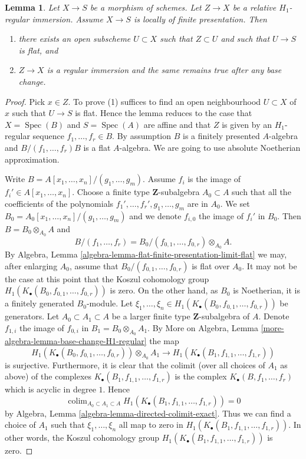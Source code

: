 \documentclass[10pt,a4paper]{amsart}
\theoremstyle{plain}
\newtheorem{lemma}[subsection]{Lemma}
\theoremstyle{definition}
\theoremstyle{remark}
\numberwithin{equation}{subsection}
\def\colim{\mathop{\mathrm{colim}}\nolimits}
\def\Spec{\mathop{\mathrm{Spec}}}
\begin{document}
\begin{lemma}
\label{lemma-flat-relative-H1-regular}
Let $X \to S$ be a morphism of schemes.
Let $Z \to X$ be a relative $H_1$-regular immersion.
Assume $X \to S$ is locally of finite presentation. Then
\begin{enumerate}
\item there exists an open subscheme $U \subset X$ such that
$Z \subset U$ and such that $U \to S$ is flat, and
\item $Z \to X$ is a regular immersion and the same remains
true after any base change.
\end{enumerate}
\end{lemma}

\begin{proof}
Pick $x \in Z$. To prove (1) suffices to find an open neighbourhood
$U \subset X$ of $x$ such that $U \to S$ is flat. Hence the lemma reduces
to the case that $X = \Spec(B)$ and $S = \Spec(A)$ are affine
and that $Z$ is given by an $H_1$-regular sequence $f_1, \ldots, f_r \in B$.
By assumption $B$ is a finitely presented $A$-algebra and
$B/(f_1, \ldots, f_r)B$ is a flat $A$-algebra. We are going to use
absolute Noetherian approximation.

\medskip\noindent
Write $B = A[x_1, \ldots, x_n]/(g_1, \ldots, g_m)$. Assume
$f_i$ is the image of $f_i' \in A[x_1, \ldots, x_n]$. Choose a finite type
$\mathbf{Z}$-subalgebra $A_0 \subset A$ such that all the coefficients
of the polynomials $f_1', \ldots, f_r', g_1, \ldots, g_m$ are in $A_0$.
We set $B_0 = A_0[x_1, \ldots, x_n]/(g_1, \ldots, g_m)$ and we denote
$f_{i, 0}$ the image of $f_i'$ in $B_0$. Then $B = B_0 \otimes_{A_0} A$
and
$$
B/(f_1, \ldots, f_r) =
B_0/(f_{0, 1}, \ldots, f_{0, r}) \otimes_{A_0} A.
$$
By
Algebra, Lemma \ref{algebra-lemma-flat-finite-presentation-limit-flat}
we may, after enlarging $A_0$, assume that
$B_0/(f_{0, 1}, \ldots, f_{0, r})$ is flat over $A_0$.
It may not be the case at this point that the Koszul cohomology group
$H_1(K_\bullet(B_0, f_{0, 1}, \ldots, f_{0, r}))$ is zero.
On the other hand, as $B_0$ is Noetherian, it is a finitely
generated $B_0$-module. Let
$\xi_1, \ldots, \xi_n \in H_1(K_\bullet(B_0, f_{0, 1}, \ldots, f_{0, r}))$
be generators. Let $A_0 \subset A_1 \subset A$ be a larger finite type
$\mathbf{Z}$-subalgebra of $A$. Denote $f_{1, i}$ the image
of $f_{0, i}$ in $B_1 = B_0 \otimes_{A_0} A_1$. By
More on Algebra, Lemma \ref{more-algebra-lemma-base-change-H1-regular}
the map
$$
H_1(K_\bullet(B_0, f_{0, 1}, \ldots, f_{0, r})) \otimes_{A_0} A_1
\longrightarrow
H_1(K_\bullet(B_1, f_{1, 1}, \ldots, f_{1, r}))
$$
is surjective. Furthermore, it is clear that the colimit (over all
choices of $A_1$ as above) of the
complexes $K_\bullet(B_1, f_{1, 1}, \ldots, f_{1, r})$ is the complex
$K_\bullet(B, f_1, \ldots, f_r)$ which is acyclic in degree $1$. Hence
$$
\colim_{A_0 \subset A_1 \subset A}
H_1(K_\bullet(B_1, f_{1, 1}, \ldots, f_{1, r}))
= 0
$$
by
Algebra, Lemma \ref{algebra-lemma-directed-colimit-exact}.
Thus we can find a choice of $A_1$ such that $\xi_1, \ldots, \xi_n$
all map to zero in $H_1(K_\bullet(B_1, f_{1, 1}, \ldots, f_{1, r}))$.
In other words, the Koszul cohomology group
$H_1(K_\bullet(B_1, f_{1, 1}, \ldots, f_{1, r}))$
is zero.


\end{proof}
\end{document}
